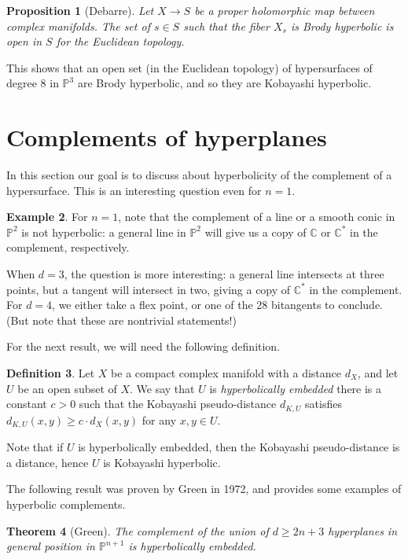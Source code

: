 \documentclass[leqno, openany]{memoir}
\newtheorem{thm}{Theorem}[section]
\newtheorem{prop}[thm]{Proposition}
\theoremstyle{definition}
\newtheorem{defn}[thm]{Definition}
\newtheorem{exm}[thm]{Example}
\theoremstyle{remark}
\theoremstyle{plain}
\theoremstyle{definition}
\theoremstyle{remark}
\newcommand{\C}{\mathbb{C}}
\renewcommand{\P}{\mathbb{P}}
\begin{document}
\begin{prop}[Debarre]
Let $X \to S$ be a proper holomorphic map between complex manifolds. The set of $s \in S$ such that the fiber $X_s$ is Brody hyperbolic is open in $S$ for the Euclidean topology.
\end{prop}

This shows that an open set (in the Euclidean topology) of hypersurfaces of degree $8$ in $\P^3$ are Brody hyperbolic, and so they are Kobayashi hyperbolic.

\section{Complements of hyperplanes}

In this section our goal is to discuss about hyperbolicity of the complement of a hypersurface. This is an interesting question even for $n=1$.

\begin{exm}
For $n=1$, note that the complement of a line or a smooth conic in $\P^2$ is not hyperbolic: a general line in $\P^2$ will give us a copy of $\C$ or $\C^\ast$ in the complement, respectively. 

When $d=3$, the question is more interesting: a general line intersects at three points, but a tangent will intersect in two, giving a copy of $\C^\ast$ in the complement. For $d=4$, we either take a flex point, or one of the 28 bitangents to conclude. (But note that these are nontrivial statements!)
\end{exm}

For the next result, we will need the following definition. 

\begin{defn}
Let $X$ be a compact complex manifold with a distance $d_X$, and let $U$ be an open subset of $X$. We say that $U$ is \textit{hyperbolically embedded} there is a constant $c>0$ such that the Kobayashi pseudo-distance $d_{K, U}$ satisfies $d_{K, U}(x, y) \geq c\cdot d_X(x, y)$ for any $x, y \in U$.
\end{defn}

Note that if $U$ is hyperbolically embedded, then the Kobayashi pseudo-distance is a distance, hence $U$ is Kobayashi hyperbolic.

The following result was proven by Green in 1972, and provides some examples of hyperbolic complements.

\begin{thm}[Green]
The complement of the union of $d \geq 2n+3$ hyperplanes in general position in $\P^{n+1}$ is hyperbolically embedded.
\end{thm}
\end{document}
